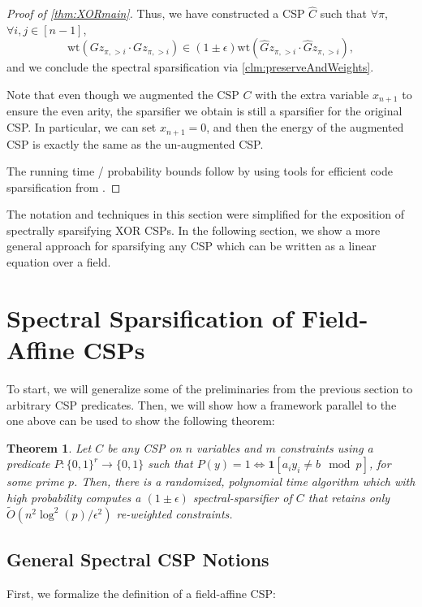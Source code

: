 \documentclass[11pt]{article}
\newtheorem{theorem}{Theorem}[section]
\theoremstyle{definition}
\newcommand{\zo}{\{0, 1\}}
\newcommand{\eps}{\epsilon}
\newcommand{\wt}{\mathrm{wt}}
\begin{document}
\begin{proof}[Proof of \cref{thm:XORmain}]
	Thus, we have constructed a CSP $\hat{C}$ such that $\forall \pi$, $\forall i, j \in [n-1]$, 
	\[
	\wt(Gz_{\pi, > i} \cdot Gz_{\pi, > i}) \in (1 \pm \eps) \wt(\hat{G}z_{\pi, > i} \cdot \hat{G}z_{\pi, > i}),
	\]
	and we conclude the spectral sparsification via \cref{clm:preserveAndWeights}.

    Note that even though we augmented the CSP $C$ with the extra variable $x_{n+1}$ to ensure the even arity, the sparsifier we obtain is still a sparsifier for the original CSP. In particular, we can set $x_{n+1} = 0$, and then the energy of the augmented CSP is exactly the same as the un-augmented CSP. 
	
	The running time / probability bounds follow by using tools for efficient code sparsification from \cite{KPS24c}. 
\end{proof}

The notation and techniques in this section were simplified for the exposition of spectrally sparsifying XOR CSPs. In the following section, we show a more general approach for sparsifying any CSP which can be written as a linear equation over a field. 

\section{Spectral Sparsification of Field-Affine CSPs}\label{sec:generalProof}

To start, we will generalize some of the preliminaries from the previous section to arbitrary CSP predicates. Then, we will show how a framework parallel to the one above can be used to show the following theorem:

\begin{theorem}\label{thm:generalCSP}
    Let $C$ be any CSP on $n$ variables and $m$ constraints using a predicate $P: \zo^r \rightarrow \zo$ such that $P(y) = 1 \iff \mathbf{1}[a_i y_i \neq b \mod p]$, for some prime $p$. Then, there is a randomized, polynomial time algorithm which with high probability computes a $(1 \pm \eps)$ spectral-sparsifier of $C$ that retains only $\widetilde{O}(n^2 \log^2(p) / \eps^2)$ re-weighted constraints.
\end{theorem}

\subsection{General Spectral CSP Notions}

First, we formalize the definition of a field-affine CSP:
\end{document}
